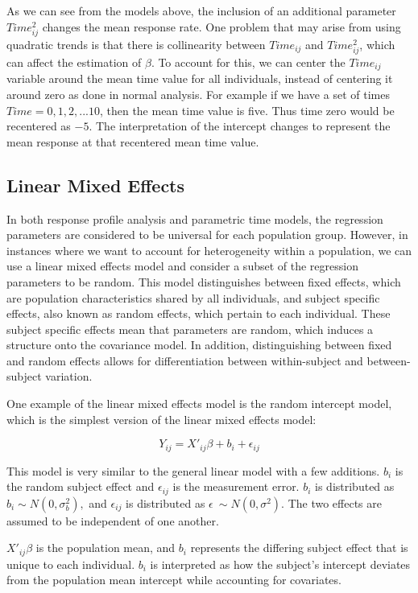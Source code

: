 \documentclass[12pt, twoside]{amherstthesis}
\begin{document}
As we can see from the models above, the inclusion of an additional parameter \(Time^2_{ij}\) changes the mean response rate. One problem that may arise from using quadratic trends is that there is collinearity between \(Time_{ij}\) and \(Time^2_{ij}\), which can affect the estimation of \(\beta\). To account for this, we can center the \(Time_{ij}\) variable around the mean time value for all individuals, instead of centering it around zero as done in normal analysis. For example if we have a set of times \(Time = {0,1,2,...10}\), then the mean time value is five. Thus time zero would be recentered as \(-5\). The interpretation of the intercept changes to represent the mean response at that recentered mean time value.

\hypertarget{linear-mixed-effects}{%
\subsection{Linear Mixed Effects}\label{linear-mixed-effects}}

In both response profile analysis and parametric time models, the regression parameters are considered to be universal for each population group. However, in instances where we want to account for heterogeneity within a population, we can use a linear mixed effects model and consider a subset of the regression parameters to be random. This model distinguishes between fixed effects, which are population characteristics shared by all individuals, and subject specific effects, also known as random effects, which pertain to each individual. These subject specific effects mean that parameters are random, which induces a structure onto the covariance model. In addition, distinguishing between fixed and random effects allows for differentiation between within-subject and between-subject variation.

One example of the linear mixed effects model is the random intercept model, which is the simplest version of the linear mixed effects model:

\[Y_{ij} = X'_{ij}\beta + b_i + \epsilon_{ij}\]

This model is very similar to the general linear model with a few additions. \(b_i\) is the random subject effect and \(\epsilon_{ij}\) is the measurement error. \(b_i\) is distributed as \(b_i \sim N(0,\sigma^2_b),\) and \(\epsilon_{ij}\) is distributed as \(\epsilon ~\sim N(0,\sigma^2).\) The two effects are assumed to be independent of one another.

\(X'_{ij}\beta\) is the population mean, and \(b_i\) represents the differing subject effect that is unique to each individual. \(b_i\) is interpreted as how the subject's intercept deviates from the population mean intercept while accounting for covariates.
\end{document}
